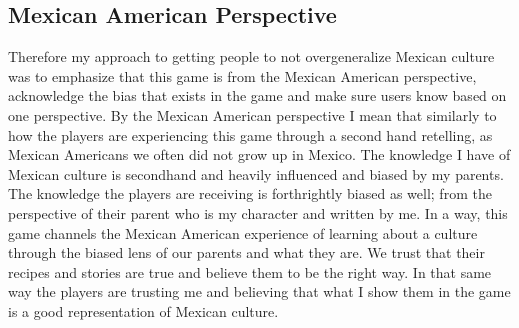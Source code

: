 \documentclass[10pt,twocolumn]{article}
\begin{document}
\subsection{Mexican American Perspective}
Therefore my approach to getting people to not overgeneralize Mexican culture was to emphasize that this game is from the Mexican American perspective, acknowledge the bias that exists in the game and make sure users know based on one perspective. By the Mexican American perspective I mean that similarly to how the players are experiencing this game through a second hand retelling, as Mexican Americans we often did not grow up in Mexico. The knowledge I have of Mexican culture is secondhand and heavily influenced and biased by my parents. The knowledge the players are receiving is forthrightly biased as well; from the perspective of their parent who is my character and written by me. In a way, this game channels the Mexican American experience of learning about a culture through the biased lens of our parents and what they are. We trust that their recipes and stories are true and believe them to be the right way. In that same way the players are trusting me and believing that what I show them in the game is a good representation of Mexican culture. 



\printbibliography 
\end{document}
